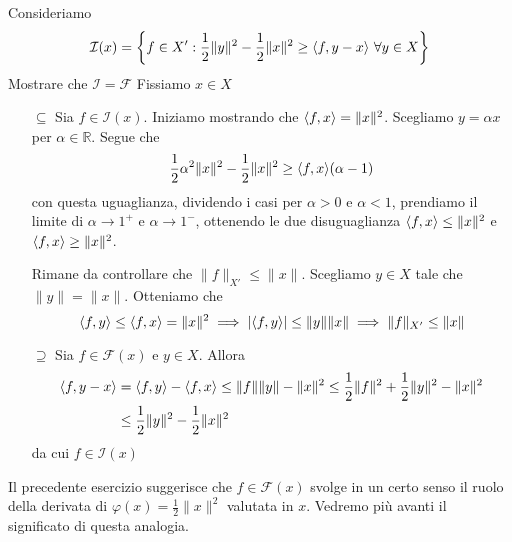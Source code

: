 \begin{eser}{}
    Consideriamo
    \[
      \mathcal{I}{(x)} = \left\{f \in X' : \frac{1}{2}\|y\|^2 - \frac{1}{2}\|x\|^2 \ge {\left\langle f, y-x\right\rangle} \,\, \forall y \in X \right\} 
    \]
    Mostrare che \(\mathcal{I} = \mathcal{F}\) 
    \tcblower
    Fissiamo \(x \in X\) 
    \begin{itemize}
        \item[\(\subseteq \)] Sia \(f \in \mathcal{I}{(x)}\). Iniziamo mostrando
            che \({\left\langle f, x\right\rangle} = \|x\|^2\). Scegliamo \(y = \alpha x \) per \(\alpha \in \mathbb{R}\). Segue che
            \[
              \frac{1}{2}\alpha^2 \|x\|^2 - \frac{1}{2}\|x\|^2 \ge {\left\langle f, x\right\rangle}
              {(\alpha - 1)}
            \]
            con questa uguaglianza, dividendo i casi per \(
            \alpha > 0 \) e \(\alpha < 1\), prendiamo il limite di \(\alpha \to 1^{+}\) e \(\alpha \to 1^{-}\), ottenendo le due disuguaglianza \({\left\langle f, x\right\rangle} \le \|x\|^2\) e \({\left\langle f, x\right\rangle} \ge \|x\|^2\).

            Rimane da controllare che \(\|f\|_{X'} \le \|x\|\). Scegliamo \(y \in X\) tale che \(\|y\| = \|x\|\). Otteniamo che
            \[
              {\left\langle f, y\right\rangle}  \le  {\left\langle f, x\right\rangle}  = \|x\|^2 \implies |{\left\langle f, y\right\rangle}| \le
              \|y\|\|x\| \implies \|f\|_{X'} \le \|x\|
            \]
        \item[\(\supseteq \)] Sia \(f \in \mathcal{F}{(x)}\) e \(y \in X\). Allora 
            \begin{align*}
                {\left\langle f, y - x\right\rangle} &= {\left\langle f, y\right\rangle}  - {\left\langle f, x\right\rangle} \le \|f\|\|y\| - \|x\|^2 \le \frac{1}{2} \|f\|^2 + \frac{1}{2}\|y\| ^2 - \|x\|^2 \\ &\le  \frac{1}{2}\|y\|^2 - \frac{1}{2}\|x\|^2
            \end{align*}
            da cui \(f \in \mathcal{I}{(x)}\) 
    \end{itemize}
\end{eser}
\begin{remark}{}
    Il precedente esercizio suggerisce che \(f \in \mathcal{F}{(x)}\) svolge in
    un certo senso il ruolo della derivata di \(\varphi {(x)} = \frac{1}{2}\|x\|^2\)  valutata in \(x\). Vedremo più avanti il significato di questa analogia.
\end{remark}
